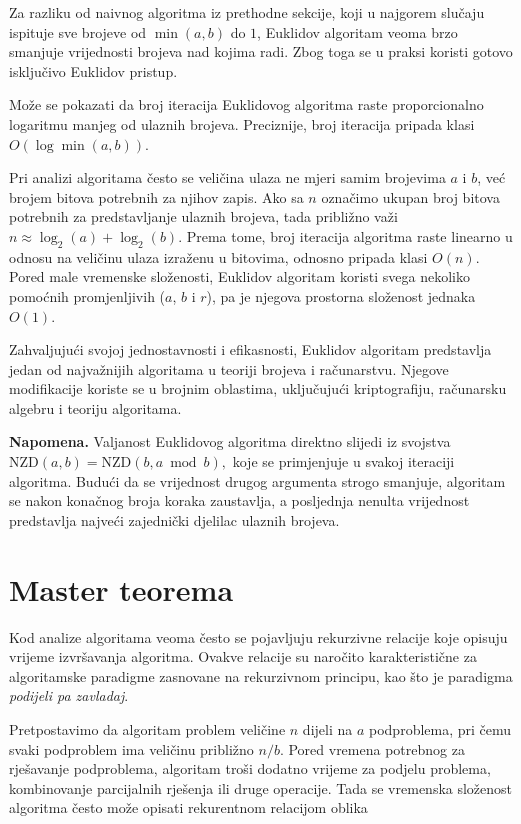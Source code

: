 Za razliku od naivnog algoritma iz prethodne sekcije, koji u najgorem slučaju ispituje sve brojeve od $\min(a,b)$ do $1$, Euklidov algoritam veoma brzo smanjuje vrijednosti brojeva nad kojima radi. Zbog toga se u praksi koristi gotovo isključivo Euklidov pristup.

Može se pokazati da broj iteracija Euklidovog algoritma raste proporcionalno logaritmu manjeg od ulaznih brojeva. Preciznije, broj iteracija pripada klasi $O(\log \min(a,b)).$

Pri analizi algoritama često se veličina ulaza ne mjeri samim brojevima $a$ i $b$, već brojem bitova potrebnih za njihov zapis. Ako sa $n$ označimo ukupan broj bitova potrebnih za predstavljanje ulaznih brojeva, tada približno važi $
n \approx \log_2(a)+\log_2(b).
$ Prema tome, broj iteracija algoritma raste linearno u odnosu na veličinu ulaza izraženu u bitovima, odnosno pripada klasi $O(n).
$ Pored male vremenske složenosti, Euklidov algoritam koristi svega nekoliko pomoćnih promjenljivih ($a$, $b$ i $r$), pa je njegova prostorna složenost jednaka $O(1).
$

Zahvaljujući svojoj jednostavnosti i efikasnosti, Euklidov algoritam predstavlja jedan od najvažnijih algoritama u teoriji brojeva i računarstvu. Njegove modifikacije koriste se u brojnim oblastima, uključujući kriptografiju, računarsku algebru i teoriju algoritama.

\textbf{Napomena.}
Valjanost Euklidovog algoritma direktno slijedi iz svojstva $\text{NZD}(a,b)=\text{NZD}(b,a\bmod b),$ koje se primjenjuje u svakoj iteraciji algoritma. Budući da se vrijednost drugog argumenta strogo smanjuje, algoritam se nakon konačnog broja koraka zaustavlja, a posljednja nenulta vrijednost predstavlja najveći zajednički djelilac ulaznih brojeva.

\section{Master teorema}

Kod analize algoritama veoma često se pojavljuju rekurzivne relacije koje opisuju
vrijeme izvršavanja algoritma. Ovakve relacije su naročito karakteristične za
algoritamske paradigme zasnovane na rekurzivnom principu, kao što je paradigma
\emph{podijeli pa zavladaj}.

Pretpostavimo da algoritam problem veličine $n$ dijeli na $a$ podproblema,
pri čemu svaki podproblem ima veličinu približno $n/b$. Pored vremena potrebnog
za rješavanje podproblema, algoritam troši dodatno vrijeme za podjelu problema,
kombinovanje parcijalnih rješenja ili druge operacije. Tada se vremenska
složenost algoritma često može opisati rekurentnom relacijom oblika

